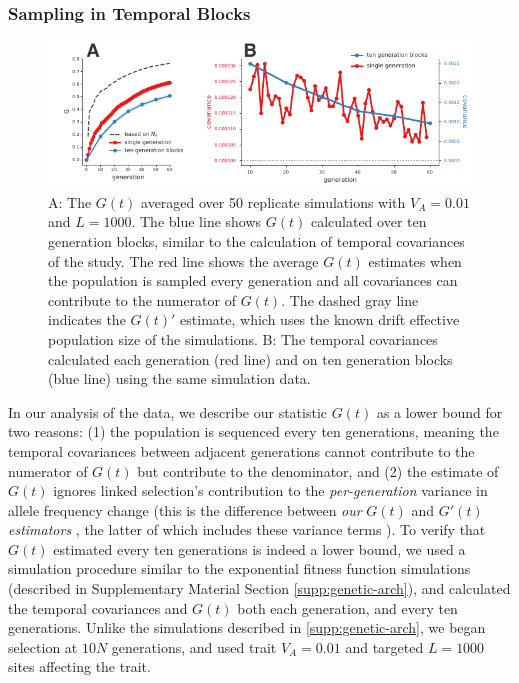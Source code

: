 \documentclass[11pt]{article}
\newcommand{\gc}[1]{{\it \color{red} #1 } }
\begin{document}
{\begin{figure}[!ht]
  \label{suppfig:convergence-corrs-gss}
\end{figure}

\subsubsection{Sampling in Temporal Blocks}
\label{supp:tempblocks}

\begin{figure}[!ht]
  \centering
  \includegraphics[width=\textwidth]{figures/fig-supp-blocks.pdf}

  \caption{A: The $G(t)$ averaged over 50 replicate simulations with $V_A =
    0.01$ and $L = 1000$. The blue line shows $G(t)$ calculated over ten
    generation blocks, similar to the calculation of temporal covariances of
    the \textcite{Barghi2019-qy} study. The red line shows the average $G(t)$
    estimates when the population is sampled every generation and all
    covariances can contribute to the numerator of $G(t)$. The dashed gray line
    indicates the $G(t)'$ estimate, which uses the known drift effective
    population size of the simulations. B: The temporal covariances calculated
    each generation (red line) and on ten generation blocks (blue line) using the
    same simulation data.}

  \label{suppfig:supp-blocks}
\end{figure}

In our analysis of the \textcite{Barghi2019-qy} data, we describe our statistic
$G(t)$ as a lower bound for two reasons: (1) the population is sequenced every
ten generations, meaning the temporal covariances between adjacent generations
cannot contribute to the numerator of $G(t)$ but contribute to the denominator,
and (2) the estimate of $G(t)$ ignores linked selection's contribution to the
\gc{per-generation} variance in allele frequency change (this is the
difference between \gc{our} $G(t)$ and
$G'(t)$ \gc{estimators}, the latter of which includes these variance terms
\parencite{Buffalo2019-io}).  To verify that $G(t)$ estimated every ten
generations is indeed a lower bound, we used a simulation procedure similar to
the exponential fitness function simulations (described in Supplementary
Material Section \ref{supp:genetic-arch}), and calculated the temporal
covariances and $G(t)$ both each generation, and every ten generations. Unlike
the simulations described in \ref{supp:genetic-arch}, we began selection at
$10N$ generations, and used trait $V_A = 0.01$ and targeted $L = 1000$ sites
affecting the trait. 

}
\end{document}
